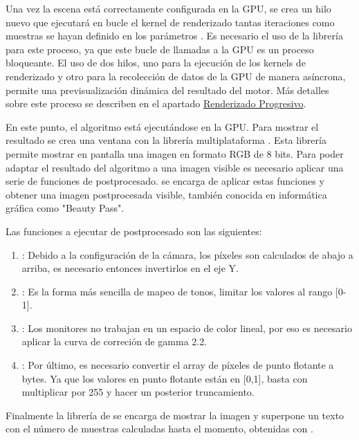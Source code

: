 Una vez la escena está correctamente configurada en la GPU, se crea un hilo nuevo que ejecutará en bucle el kernel de renderizado tantas iteraciones como muestras se hayan definido en los parámetros . Es necesario el uso de la librería  para este proceso, ya que este bucle de llamadas a la GPU es un proceso bloqueante. El uso de dos hilos, uno para la ejecución de los kernels de renderizado y otro para la recolección de datos de la GPU de manera asíncrona, permite una previsualización dinámica del resultado del motor. Más detalles sobre este proceso se describen en el apartado \hyperref[progressiverender]{Renderizado Progresivo}.

En este punto, el algoritmo está ejecutándose en la GPU. Para mostrar el resultado se crea una ventana con la librería multiplataforma . Esta librería permite mostrar en pantalla una imagen en formato RGB de 8 bits. Para poder adaptar el resultado del algoritmo a una imagen visible es necesario aplicar una serie de funciones de postprocesado.  se encarga de aplicar estas funciones y obtener una imagen postprocesada visible, también conocida en informática gráfica como "Beauty Pass".

Las funciones a ejecutar de postprocesado son las siguientes:

\begin{enumerate}
	
	\item {}: Debido a la configuración de la cámara, los píxeles son calculados de abajo a arriba, es necesario entonces invertirlos en el eje Y.
	\item {}: Es la forma más sencilla de mapeo de tonos, limitar los valores al rango [0-1].
	\item {}: Los monitores no trabajan en un espacio de color lineal, por eso es necesario aplicar la curva de correción de gamma 2.2.
	\item {}: Por último, es necesario convertir el array de píxeles de punto flotante a bytes. Ya que los valores en punto flotante están en [0,1], basta con multiplicar por 255 y hacer un posterior truncamiento.

\end{enumerate}

Finalmente la librería de  se encarga de mostrar la imagen y superpone un texto con el número de muestras calculadas hasta el momento, obtenidas con .

